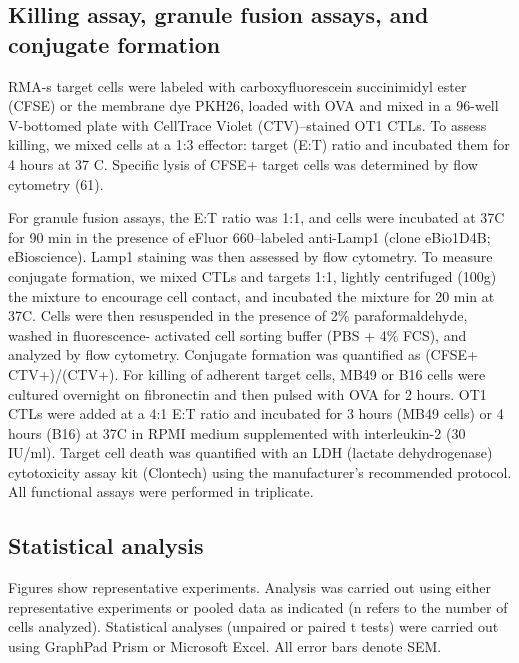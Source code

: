 \subsection{Killing assay, granule fusion assays, and conjugate formation}
RMA-s target cells were labeled with carboxyfluorescein succinimidyl ester (CFSE) or the membrane dye PKH26, loaded with OVA and mixed in a 96-well V-bottomed plate with CellTrace Violet (CTV)–stained OT1 CTLs. To assess killing, we mixed cells at a 1:3 effector: target (E:T) ratio and incubated them for 4 hours at 37 \degree C. Specific lysis of CFSE+ target cells was determined by flow cytometry (61).

For granule fusion assays, the E:T ratio was 1:1, and cells were incubated at 37\degree C for 90 min in the presence of eFluor 660–labeled anti-Lamp1 (clone eBio1D4B; eBioscience). Lamp1 staining was then assessed by flow cytometry. To measure conjugate formation, we mixed CTLs and targets 1:1, lightly centrifuged (100g) the mixture to encourage cell contact, and incubated the mixture for 20 min at 37\degree C. Cells were then resuspended in the presence of 2\% paraformaldehyde, washed in fluorescence- activated cell sorting buffer (PBS + 4\% FCS), and analyzed by flow cytometry. Conjugate formation was quantified as (CFSE+ CTV+)/(CTV+). For killing of adherent target cells, MB49 or B16 cells were cultured overnight on fibronectin and then pulsed with OVA for 2 hours. OT1 CTLs were added at a 4:1 E:T ratio and incubated for 3 hours (MB49 cells) or 4 hours (B16) at 37\degree C in RPMI medium supplemented with interleukin-2 (30 IU/ml). Target cell death was quantified with an LDH (lactate dehydrogenase) cytotoxicity assay kit (Clontech) using the manufacturer’s recommended protocol. All functional assays were performed in triplicate.

\subsection{Statistical analysis}
Figures show representative experiments. Analysis was carried out using either representative experiments or pooled data as indicated (n refers to the number of cells analyzed). Statistical analyses (unpaired or paired t tests) were carried out using GraphPad Prism or Microsoft Excel. All error bars denote SEM.

